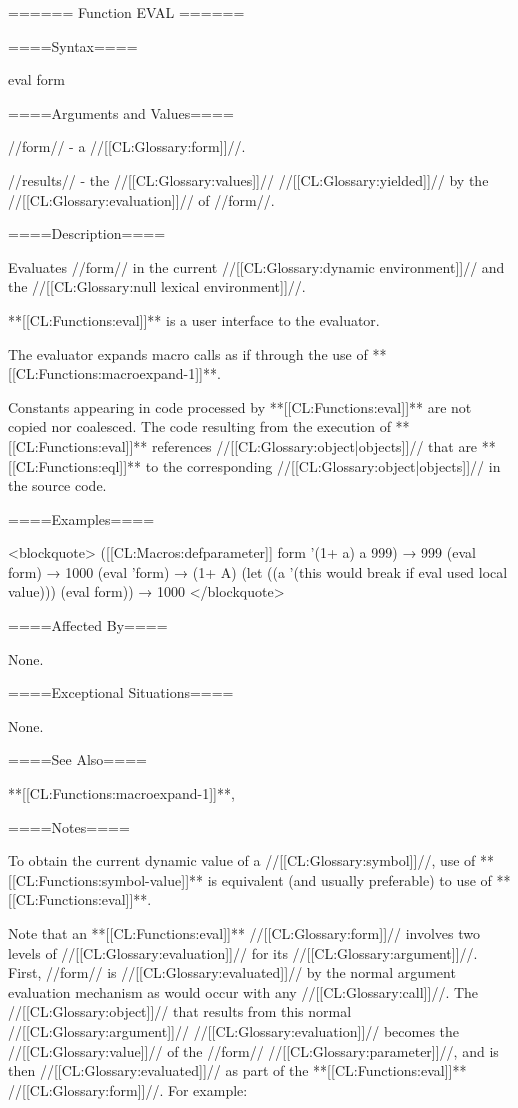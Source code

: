 ====== Function EVAL ======

====Syntax====

\DefunWithValues eval {form} {}

====Arguments and Values====

//form// - a //[[CL:Glossary:form]]//.

//results// - the //[[CL:Glossary:values]]// //[[CL:Glossary:yielded]]// by the //[[CL:Glossary:evaluation]]// of //form//.

====Description====

Evaluates //form// in the current //[[CL:Glossary:dynamic environment]]// and the //[[CL:Glossary:null lexical environment]]//.

**[[CL:Functions:eval]]** is a user interface to the evaluator.

The evaluator expands macro calls as if through the use of **[[CL:Functions:macroexpand-1]]**.

Constants appearing in code processed by **[[CL:Functions:eval]]** are not copied nor coalesced. The code resulting from the execution of **[[CL:Functions:eval]]** references //[[CL:Glossary:object|objects]]// that are **[[CL:Functions:eql]]** to the corresponding //[[CL:Glossary:object|objects]]// in the source code.

====Examples====

<blockquote> ([[CL:Macros:defparameter]] form '(1+ a) a 999) → 999 (eval form) → 1000 (eval 'form) → (1+ A) (let ((a '(this would break if eval used local value))) (eval form)) → 1000 </blockquote>

====Affected By====

None.

====Exceptional Situations====

None.

====See Also====

**[[CL:Functions:macroexpand-1]]**, {\secref\EvaluationModel}

====Notes====

To obtain the current dynamic value of a //[[CL:Glossary:symbol]]//, use of **[[CL:Functions:symbol-value]]** is equivalent (and usually preferable) to use of **[[CL:Functions:eval]]**.

Note that an **[[CL:Functions:eval]]** //[[CL:Glossary:form]]// involves two levels of //[[CL:Glossary:evaluation]]// for its //[[CL:Glossary:argument]]//. First, //form// is //[[CL:Glossary:evaluated]]// by the normal argument evaluation mechanism as would occur with any //[[CL:Glossary:call]]//. The //[[CL:Glossary:object]]// that results from this normal //[[CL:Glossary:argument]]// //[[CL:Glossary:evaluation]]// becomes the //[[CL:Glossary:value]]// of the //form// //[[CL:Glossary:parameter]]//, and is then //[[CL:Glossary:evaluated]]// as part of the **[[CL:Functions:eval]]** //[[CL:Glossary:form]]//. For example:

